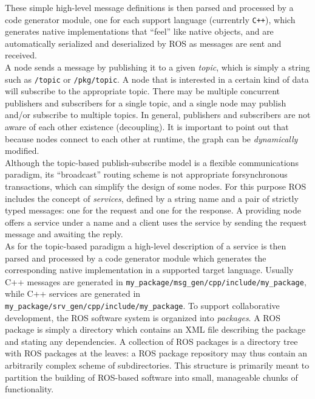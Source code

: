 These simple high-level message definitions is then parsed and processed by a code 
generator module, one for each support language (currentrly \texttt{C++}), which generates 
native implementations that “feel” like native objects, and are automatically 
serialized and deserialized by ROS as messages are sent and received.
\\
A node sends a message by publishing it to a given \textit{topic}, which is simply
a string such as \texttt{/topic} or \texttt{/pkg/topic}. A node that is interested
in a certain kind of data will subscribe to the appropriate topic. There may be multiple
concurrent publishers and subscribers for a single topic, and a single node
may publish and/or subscribe to multiple topics. In general, publishers and
subscribers are not aware of each other existence (decoupling). 
It is important to point out that because nodes connect to each other at runtime,
the graph can be \textit{dynamically} modified.
\\
Although the topic-based publish-subscribe model is a flexible communications
paradigm, its “broadcast” routing scheme is not appropriate forsynchronous transactions,
which can simplify the design of some nodes.
For this purpose ROS includes the concept of \textit{services}, defined by a string name
and a pair of strictly typed messages: one for the request and one for the
response. A providing node offers a service under a name and a client uses
the service by sending the request message and awaiting the reply.
\\
As for the topic-based paradigm a high-level description of a service is then
parsed and processed by a code generator module which generates the corresponding
native implementation in a supported target language.
Usually C++ messages are generated in \texttt{my\_package/msg\_gen/cpp/include/my\_package},
while C++ services are generated in \texttt{my\_package/srv\_gen/cpp/include/my\_package}.
To support collaborative development, the ROS software system is organized into \textit{packages}.
A ROS package is simply a directory which contains an XML file describing the package
and stating any dependencies. A collection of ROS packages is a directory tree with ROS
packages at the leaves: a ROS package repository may thus contain an arbitrarily complex
scheme of subdirectories. This structure is primarily meant to partition the building of 
ROS-based software into small, manageable chunks of functionality.
\\

